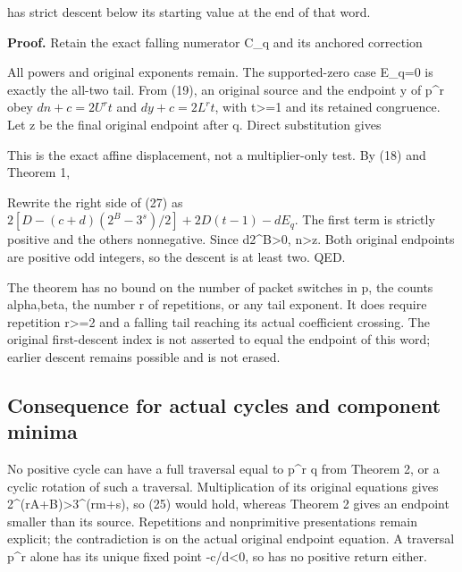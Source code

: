 
has strict descent below its starting value at the end of that word.

\textbf{Proof.} Retain the exact falling numerator C\_q and its anchored
correction


All powers and original exponents remain. The supported-zero case E\_q=0
is exactly the all-two tail. From (19), an original source and the
endpoint y of p\^{}r obey \(dn+c=2U^rt\) and \(dy+c=2L^rt\), with
t\textgreater=1 and its retained congruence. Let z be the final original
endpoint after q. Direct substitution gives


This is the exact affine displacement, not a multiplier-only test. By
(18) and Theorem 1,


Rewrite the right side of (27) as
\(2[D-(c+d)(2^B-3^s)/2]+2D(t-1)-dE_q\). The first term is strictly
positive and the others nonnegative. Since d2\^{}B\textgreater0,
n\textgreater z. Both original endpoints are positive odd integers, so
the descent is at least two. QED.

The theorem has no bound on the number of packet switches in p, the
counts alpha,beta, the number r of repetitions, or any tail exponent. It
does require repetition r\textgreater=2 and a falling tail reaching its
actual coefficient crossing. The original first-descent index is not
asserted to equal the endpoint of this word; earlier descent remains
possible and is not erased.

\subsection{Consequence for actual cycles and component minima}

No positive cycle can have a full traversal equal to p\^{}r q from
Theorem 2, or a cyclic rotation of such a traversal. Multiplication of
its original equations gives 2\^{}(rA+B)\textgreater3\^{}(rm+s), so (25)
would hold, whereas Theorem 2 gives an endpoint smaller than its source.
Repetitions and nonprimitive presentations remain explicit; the
contradiction is on the actual original endpoint equation. A traversal
p\^{}r alone has its unique fixed point -c/d\textless0, so has no
positive return either.

